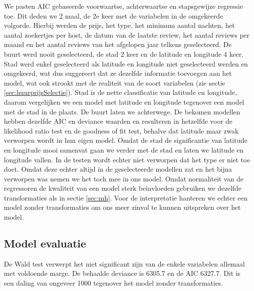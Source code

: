 \documentclass[a4paper,kulak]{kulakarticle} %
\begin{document}
We pasten AIC gebaseerde voorwaartse, achterwaartse en stapsgewijze regressie toe.
Dit deden we 2 maal, de 2e keer met de variabelen in de omgekeerde volgorde.
Hierbij werden de prijs, het type, het minimum aantal nachten, het aantal zoekertjes per host, de datum van de laatste review, het aantal reviews per maand en het aantal reviews van het afgelopen jaar telkens geselecteerd.
De buurt werd nooit geselecteerd, de stad 2 keer en de latitude en longitude 4 keer. Stad werd enkel geselecteerd als latitude en longitude niet geselecteerd werden en omgekeerd, wat dus suggereert dat ze dezelfde informatie toevoegen aan het model, wat ook strookt met de realiteit van de soort variabelen (zie sectie \ref{sec:huurprijsSelectie}).
Stad is de nette classificatie van latitude en longitude, daarom vergelijken we een model met latitude en longitude tegenover een model met de stad in de plaats.
De buurt laten we achterwege.
De bekomen modellen hebben dezelfde AIC en deviance waarden en resulteren in hetzelfde voor de likelihood ratio test en de goodness of fit test, behalve dat latitude maar zwak verworpen wordt in hun eigen model.
Omdat de stad de significantie van latitude en longitude mooi samenvat gaan we verder met de stad en laten we latitude en longitude vallen.  
In de testen wordt echter niet verworpen dat het type er niet toe doet.
Omdat deze echter altijd in de geselecteerde modellen zat en het bijna verworpen was nemen we het toch mee in ons model.
Omdat normaliteit van de regressoren de kwaliteit van een model sterk beinvloeden gebruiken we dezelfde transformaties als in sectie \ref{sec:mh}.
Voor de interpretatie hanteren we echter een model zonder transformaties om ons meer zinvol te kunnen uitspreken over het model. 
\subsection{Model evaluatie}

De Wald test verwerpt het niet significant zijn van de enkele variabelen allemaal  met voldoende marge.
De behaalde deviance is 6305.7 en de AIC 6327.7.
Dit is een daling van ongeveer 1000 tegenover het model zonder transformaties.\\
\end{document}
